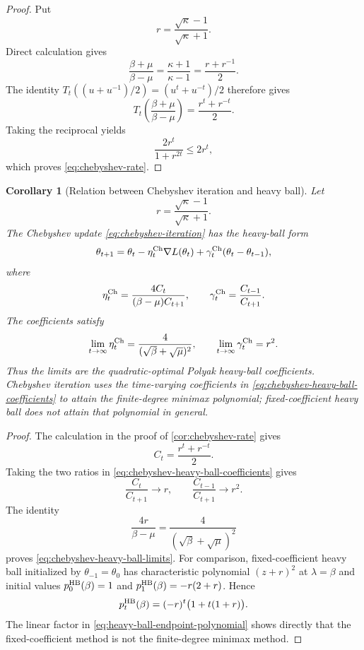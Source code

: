 \documentclass[11pt,twoside]{article}
\newtheorem{corollary}[theorem]{Corollary}
\theoremstyle{definition}
\theoremstyle{remark}
\begin{document}
\begin{proof}
Put
\[
 r=\frac{\sqrt\kappa-1}{\sqrt\kappa+1}.
\]
Direct calculation gives
\[
 \frac{\beta+\mu}{\beta-\mu}
 =\frac{\kappa+1}{\kappa-1}
 =\frac{r+r^{-1}}2.
\]
The identity
$T_t((u+u^{-1})/2)=(u^t+u^{-t})/2$ therefore gives
\[
 T_t\left(\frac{\beta+\mu}{\beta-\mu}\right)
 =\frac{r^t+r^{-t}}2.
\]
Taking the reciprocal yields
\[
 \frac{2r^t}{1+r^{2t}}\le2r^t,
\]
which proves \cref{eq:chebyshev-rate}.
\end{proof}

\begin{corollary}[Relation between Chebyshev iteration and heavy ball]
\label{cor:chebyshev-heavy-ball}
Let
\[
 r=\frac{\sqrt\kappa-1}{\sqrt\kappa+1}.
\]
The Chebyshev update \cref{eq:chebyshev-iteration} has the heavy-ball form
\begin{equation}
 \theta_{t+1}
 =\theta_t-\eta_t^{\rm Ch}\nabla L(\theta_t)
  +\gamma_t^{\rm Ch}(\theta_t-\theta_{t-1}),
 \label{eq:chebyshev-heavy-ball-form}
\end{equation}
where
\begin{equation}
 \eta_t^{\rm Ch}=\frac{4C_t}{(\beta-\mu)C_{t+1}},
 \qquad
 \gamma_t^{\rm Ch}=\frac{C_{t-1}}{C_{t+1}}.
 \label{eq:chebyshev-heavy-ball-coefficients}
\end{equation}
The coefficients satisfy
\begin{equation}
 \lim_{t\to\infty}\eta_t^{\rm Ch}
 =\frac{4}{(\sqrt\beta+\sqrt\mu)^2},
 \qquad
 \lim_{t\to\infty}\gamma_t^{\rm Ch}=r^2.
 \label{eq:chebyshev-heavy-ball-limits}
\end{equation}
Thus the limits are the quadratic-optimal Polyak heavy-ball coefficients.
Chebyshev iteration uses the time-varying coefficients in
\cref{eq:chebyshev-heavy-ball-coefficients} to attain the finite-degree
minimax polynomial; fixed-coefficient heavy ball does not attain that
polynomial in general.
\end{corollary}

\begin{proof}
The calculation in the proof of \cref{cor:chebyshev-rate} gives
\[
 C_t=\frac{r^t+r^{-t}}2.
\]
Taking the two ratios in
\cref{eq:chebyshev-heavy-ball-coefficients} gives
\[
 \frac{C_t}{C_{t+1}}\longrightarrow r,
 \qquad
 \frac{C_{t-1}}{C_{t+1}}\longrightarrow r^2.
\]
The identity
\[
 \frac{4r}{\beta-\mu}
 =\frac{4}{(\sqrt\beta+\sqrt\mu)^2}
\]
proves \cref{eq:chebyshev-heavy-ball-limits}. For comparison, fixed-coefficient
heavy ball initialized by $\theta_{-1}=\theta_0$ has characteristic
polynomial $(z+r)^2$ at $\lambda=\beta$ and initial values
$p_0^{\rm HB}(\beta)=1$ and $p_1^{\rm HB}(\beta)=-r(2+r)$. Hence
\begin{equation}
 p_t^{\rm HB}(\beta)=(-r)^t\bigl(1+t(1+r)\bigr).
 \label{eq:heavy-ball-endpoint-polynomial}
\end{equation}
The linear factor in \cref{eq:heavy-ball-endpoint-polynomial} shows directly
that the fixed-coefficient method is not the finite-degree minimax method.
\end{proof}
\end{document}
